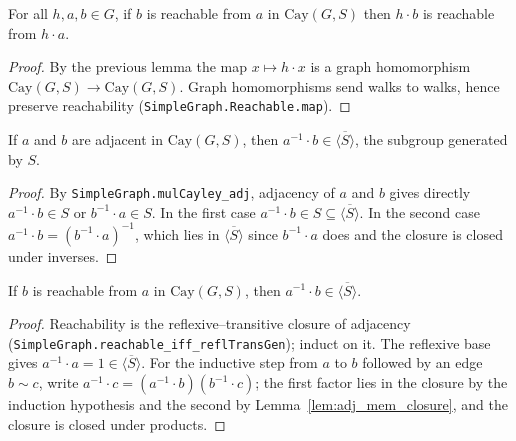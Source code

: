 \begin{lemma}
    \label{lem:reachable_mul_left}
    \leanok
    For all $h, a, b \in G$, if $b$ is reachable from $a$ in $\mathrm{Cay}(G,S)$
    then $h \cdot b$ is reachable from $h \cdot a$.
\end{lemma}
\begin{proof}
    By the previous lemma the map $x \mapsto h \cdot x$ is a graph homomorphism
    $\mathrm{Cay}(G,S) \to \mathrm{Cay}(G,S)$. Graph homomorphisms send walks to
    walks, hence preserve reachability (\texttt{SimpleGraph.Reachable.map}).
\end{proof}

\begin{lemma}
    \label{lem:adj_mem_closure}
    \leanok
    If $a$ and $b$ are adjacent in $\mathrm{Cay}(G,S)$, then $a^{-1} \cdot b \in
    \overline{\langle S \rangle}$, the subgroup generated by $S$.
\end{lemma}
\begin{proof}
    By \texttt{SimpleGraph.mulCayley\_adj}, adjacency of $a$ and $b$ gives directly
    $a^{-1} \cdot b \in S$ or $b^{-1} \cdot a \in S$. In the first case
    $a^{-1} \cdot b \in S \subseteq \overline{\langle S \rangle}$. In the second case
    $a^{-1} \cdot b = (b^{-1} \cdot a)^{-1}$, which lies in
    $\overline{\langle S \rangle}$ since $b^{-1} \cdot a$ does and the closure is
    closed under inverses.
\end{proof}

\begin{lemma}
    \label{lem:mem_closure_of_reachable}
    \leanok
    If $b$ is reachable from $a$ in $\mathrm{Cay}(G,S)$, then $a^{-1} \cdot b \in
    \overline{\langle S \rangle}$.
\end{lemma}
\begin{proof}
    Reachability is the reflexive--transitive closure of adjacency
    (\texttt{SimpleGraph.reachable\_iff\_reflTransGen}); induct on it. The reflexive
    base gives $a^{-1} \cdot a = 1 \in \overline{\langle S \rangle}$. For the
    inductive step from $a$ to $b$ followed by an edge $b \sim c$, write
    $a^{-1} \cdot c = (a^{-1} \cdot b)(b^{-1} \cdot c)$; the first factor lies in the
    closure by the induction hypothesis and the second by
    Lemma~\ref{lem:adj_mem_closure}, and the closure is closed under products.
\end{proof}

